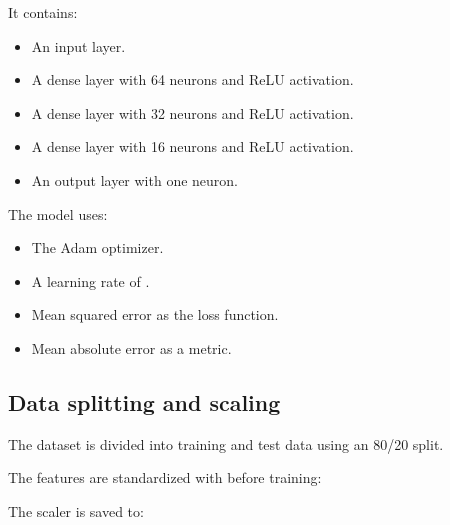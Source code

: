 \documentclass[letterpaper,10pt,english]{sphinxmanual}
\begin{document}
\sphinxAtStartPar
It contains:
\begin{itemize}
\item {} 
\sphinxAtStartPar
An input layer.

\item {} 
\sphinxAtStartPar
A dense layer with 64 neurons and ReLU activation.

\item {} 
\sphinxAtStartPar
A dense layer with 32 neurons and ReLU activation.

\item {} 
\sphinxAtStartPar
A dense layer with 16 neurons and ReLU activation.

\item {} 
\sphinxAtStartPar
An output layer with one neuron.

\end{itemize}

\sphinxAtStartPar
The model uses:
\begin{itemize}
\item {} 
\sphinxAtStartPar
The Adam optimizer.

\item {} 
\sphinxAtStartPar
A learning rate of .

\item {} 
\sphinxAtStartPar
Mean squared error as the loss function.

\item {} 
\sphinxAtStartPar
Mean absolute error as a metric.

\end{itemize}


\subsection{Data splitting and scaling}
\label{\detokenize{workflow:data-splitting-and-scaling}}
\sphinxAtStartPar
The dataset is divided into training and test data using an 80/20 split.

\sphinxAtStartPar
The features are standardized with  before training:

\begin{sphinxVerbatim}[commandchars=\\\{\}]
  
\end{sphinxVerbatim}

\sphinxAtStartPar
The scaler is saved to:
\end{document}
